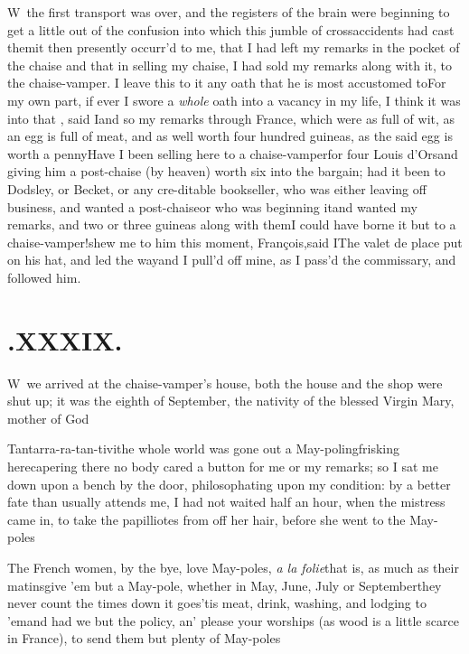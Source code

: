 \documentclass{article}
\begin{document}
\lettrine{W}{\,} the first transport was over,
and the registers of the brain were beginning to get a little out
of the confusion into which this jumble of cross\pb accidents had cast
them\tsk it then presently occurr’d to me, that I had left
my remarks in the pocket of the chaise\break
\tsk and that in selling my
chaise, I had sold my remarks along with it, to the chaise-vamper.
\hskip 78pt  I leave this \break to it any oath that he is most accustomed
to\tsh For my own part, if ever I swore a \textit{whole}
oath into a vacancy in my life, I think it was into
that\tsh {}  , said I\tsk and so my
remarks through France, which were as full of wit, as an egg
is full of meat, and as well worth four hundred guineas, as the
said egg is worth a penny\tsk Have I been selling here to a
chaise-vamper\tsk for four Louis d’Ors\tsk and
giving him a post-chaise (by heaven) worth six into the bargain;
had it been to Dodsley, or Becket, or any
cre-\pb ditable bookseller, who was either leaving off business, and
wanted a post-chaise\tsk or who was beginning it\tsk and wanted
my remarks, and two or three guineas along with them\tsk I could
have borne it
\tsh but to a chaise-vamper!\tsk shew me to
him this moment, François,\tsk said I\tsk The
valet de place put on his hat, and led the way\tsk and I
pull’d off mine, as I pass’d the commissary, and
followed him.

\newpage
\section{.\enspace XXXIX.}

\lettrine{W}{\,} we arrived at the
chaise-vamper’s house, both the house and the shop were shut
up; it was the eighth of September, the nativity of the
blessed Virgin Mary, mother of God\tsh

\tsh Tantarra-ra-tan-tivi\tsh the whole world was gone out a
May-poling\break\tsk frisking here\tsk capering there\tsk
no\break
body cared a button for me or my remarks; so I sat me down upon
a bench by the door, philosophating upon my condition: by a
better fate than usually attends me, I had not waited half an
hour, when the mistress came in, to take the papilliotes from
off her hair, before she went to the May-poles\tsh

The French women, by the bye, love May-poles, \textit{a
la folie}\tsk that is, as much as\pb
their matins\tsh give ’em but a May-pole, whether in May, June,
July or September\tsk they never count the times\break
\tsh down it
goes\tsh ’tis meat, drink, washing, and lodging to ’em\tsh and
had we but the policy, an’ please your worships (as wood is a
little scarce in France), to send them but plenty of
May-\break poles\tsh
\end{document}
